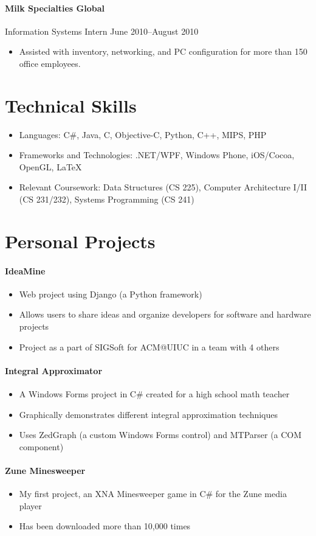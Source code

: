 \documentclass[letterpaper,12pt]{article}
\begin{document}
\paragraph {Milk Specialties Global}
Information Systems Intern \hfill June 2010--August 2010
\begin{itemize}
\item Assisted with inventory, networking, and PC configuration
for more than 150 office employees.
\end{itemize}

\section*{Technical Skills}
\begin{itemize}
\item Languages: C\#, Java, C, Objective-C, Python, C++, MIPS, PHP
\item Frameworks and Technologies: .NET/WPF, Windows Phone, iOS/Cocoa,
OpenGL, \LaTeX
\item Relevant Coursework: Data Structures (CS 225),
Computer Architecture I/II (CS 231/232), Systems Programming (CS 241)
\end{itemize}

\section*{Personal Projects}
\paragraph{IdeaMine}
\begin{itemize}
\item Web project using Django (a Python framework)
\item Allows users to share ideas and organize developers
for software and hardware projects
\item Project as a part of SIGSoft for ACM@UIUC in a team with 4 others
\end{itemize}

\paragraph{Integral Approximator}
\begin{itemize}
\item A Windows Forms project in C\# created for a high school math teacher
\item Graphically demonstrates different integral approximation techniques
\item Uses ZedGraph (a custom Windows Forms control)
and MTParser (a COM component)
\end{itemize}

\paragraph{Zune Minesweeper}
\begin{itemize}
\item My first project, an XNA Minesweeper game in C\#
for the Zune media player
\item Has been downloaded more than 10,000 times
\end{itemize}
\end{document}
